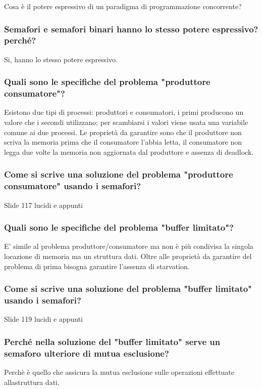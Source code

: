 \documentclass{article}
\begin{document}
Cosa è il potere espressivo di un paradigma di programmazione concorrente?
\subsubsection{Semafori e semafori binari hanno lo stesso potere espressivo? perché?}
Si, hanno lo stesso potere espressivo.

\subsubsection{Quali sono le specifiche del problema "produttore consumatore"?}
Esistono due tipi di processi: produttori e consumatori, i primi producono un
valore che i secondi utilizzano; per scambiarsi i valori viene usata una
variabile comune ai due processi. Le proprietà da garantire sono che il
produttore non scriva la memoria prima che il consumatore l'abbia letta, il
consumatore non legga due volte la memoria non aggiornata dal produttore e
assenza di deadlock.

\subsubsection{Come si scrive una soluzione del problema "produttore consumatore" usando i semafori?}
Slide 117 lucidi e appunti

\subsubsection{Quali sono le specifiche del problema "buffer limitato"?}
E' simile al problema produttore/consumatore ma non è più condivisa la singola
locazione di memoria ma un struttura dati. Oltre alle proprietà da garantire
del problema di prima bisogna garantire l'assenza di starvation.

\subsubsection{Come si scrive una soluzione del problema "buffer limitato" usando i semafori?}
Slide 119 lucidi e appunti

\subsubsection{Perché nella soluzione del "buffer limitato" serve un semaforo ulteriore di mutua esclusione?}
Perchè è quello che assicura la mutua esclusione sulle operazioni effettuate
allastruttura dati.
\end{document}

